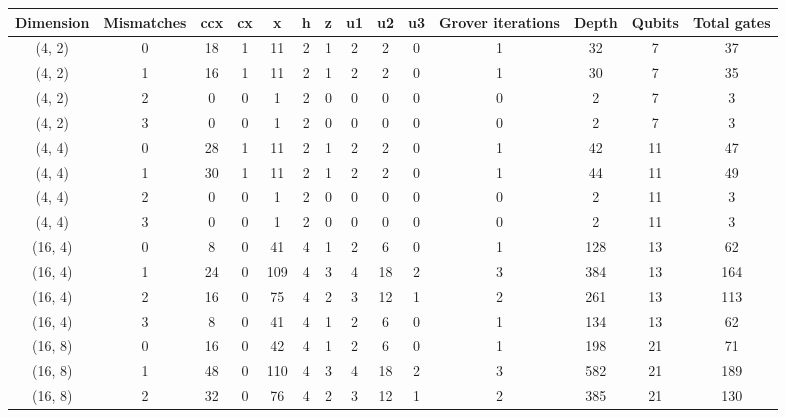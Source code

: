 \begin{tabular}{|c|c||c|c|c|c|c|c|c|c||c|c|c|c|}
\toprule
Dimension & Mismatches & ccx & cx &   x & h & z & u1 & u2 & u3 & Grover iterations & Depth & Qubits & Total gates \\
\midrule
   (4, 2) &          0 &  18 &  1 &  11 & 2 & 1 &  2 &  2 &  0 &                 1 &    32 &      7 &          37 \\
   (4, 2) &          1 &  16 &  1 &  11 & 2 & 1 &  2 &  2 &  0 &                 1 &    30 &      7 &          35 \\
   (4, 2) &          2 &   0 &  0 &   1 & 2 & 0 &  0 &  0 &  0 &                 0 &     2 &      7 &           3 \\
   (4, 2) &          3 &   0 &  0 &   1 & 2 & 0 &  0 &  0 &  0 &                 0 &     2 &      7 &           3 \\
   (4, 4) &          0 &  28 &  1 &  11 & 2 & 1 &  2 &  2 &  0 &                 1 &    42 &     11 &          47 \\
   (4, 4) &          1 &  30 &  1 &  11 & 2 & 1 &  2 &  2 &  0 &                 1 &    44 &     11 &          49 \\
   (4, 4) &          2 &   0 &  0 &   1 & 2 & 0 &  0 &  0 &  0 &                 0 &     2 &     11 &           3 \\
   (4, 4) &          3 &   0 &  0 &   1 & 2 & 0 &  0 &  0 &  0 &                 0 &     2 &     11 &           3 \\
  (16, 4) &          0 &   8 &  0 &  41 & 4 & 1 &  2 &  6 &  0 &                 1 &   128 &     13 &          62 \\
  (16, 4) &          1 &  24 &  0 & 109 & 4 & 3 &  4 & 18 &  2 &                 3 &   384 &     13 &         164 \\
  (16, 4) &          2 &  16 &  0 &  75 & 4 & 2 &  3 & 12 &  1 &                 2 &   261 &     13 &         113 \\
  (16, 4) &          3 &   8 &  0 &  41 & 4 & 1 &  2 &  6 &  0 &                 1 &   134 &     13 &          62 \\
  (16, 8) &          0 &  16 &  0 &  42 & 4 & 1 &  2 &  6 &  0 &                 1 &   198 &     21 &          71 \\
  (16, 8) &          1 &  48 &  0 & 110 & 4 & 3 &  4 & 18 &  2 &                 3 &   582 &     21 &         189 \\
  (16, 8) &          2 &  32 &  0 &  76 & 4 & 2 &  3 & 12 &  1 &                 2 &   385 &     21 &         130 \\

\end{tabular}

